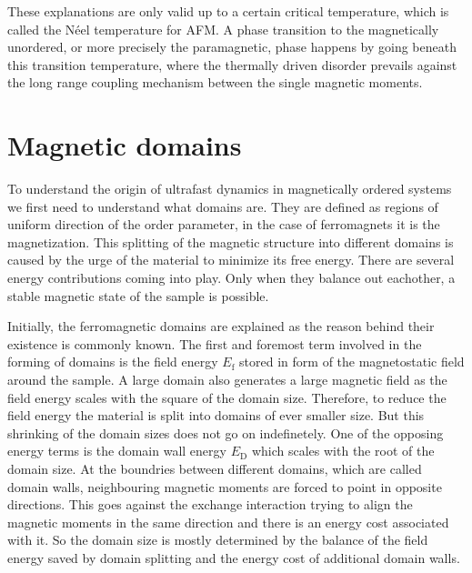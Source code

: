 \FloatBarrier
These explanations are only valid up to a certain critical temperature, which is called the Néel temperature for AFM.
A phase transition to the magnetically unordered, or more precisely the paramagnetic, phase happens by going beneath this transition temperature, where the thermally driven disorder prevails against the long range coupling mechanism between the single magnetic moments.


\section{Magnetic domains}
To understand the origin of ultrafast dynamics in magnetically ordered systems we first need to understand what domains are.
They are defined as regions of uniform direction of the order parameter, in the case of ferromagnets it is the magnetization.
This splitting of the magnetic structure into different domains is caused by the urge of the material to minimize its free energy.
There are several energy contributions coming into play.
Only when they balance out eachother, a stable magnetic state of the sample is possible.

Initially, the ferromagnetic domains are explained as the reason behind their existence is commonly known.
The first and foremost term involved in the forming of domains is the field energy $E_{\text{f}}$ stored in form of the magnetostatic field around the sample.
A large domain also generates a large magnetic field as the field energy scales with the square of the domain size.
Therefore, to reduce the field energy the material is split into domains of ever smaller size.
But this shrinking of the domain sizes does not go on indefinetely.
One of the opposing energy terms is the domain wall energy $E_{\text{D}}$ which scales with the root of the domain size.
At the boundries between different domains, which are called domain walls, neighbouring magnetic moments are forced to point in opposite directions.
This goes against the exchange interaction trying to align the magnetic moments in the same direction and there is an energy cost associated with it.
So the domain size is mostly determined by the balance of the field energy saved by domain splitting and the energy cost of additional domain walls.

